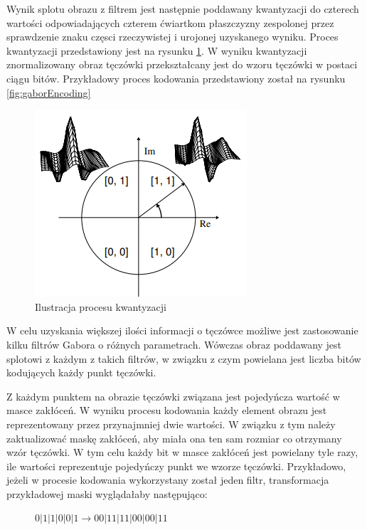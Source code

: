 Wynik splotu obrazu z filtrem jest następnie poddawany kwantyzacji \cite{DaugmanHowIrisRecognitionWorks} do czterech wartości odpowiadających
czterem \'cwiartkom płaszczyzny zespolonej przez sprawdzenie znaku częsci rzeczywistej i urojonej
uzyskanego wyniku. Proces kwantyzacji przedstawiony jest na rysunku \ref{fig:encodingQuant}. W wyniku
kwantyzacji znormalizowany obraz tęczówki przekształcany jest do wzoru tęczówki w postaci ciągu bitów.
Przykładowy proces kodowania przedstawiony został na rysunku \ref{fig:gaborEncoding}

\begin{figure}[ht]
  \centering
  \includegraphics{images/encoding/quantization.png}
  \caption{Ilustracja procesu kwantyzacji}
  \label{fig:encodingQuant}
\end{figure}

W celu uzyskania większej ilości informacji o tęczówce możliwe jest zastosowanie kilku filtrów
Gabora o różnych parametrach. Wówczas obraz poddawany jest splotowi z każdym z takich filtrów, w
związku z czym powielana jest liczba bitów kodujących każdy punkt tęczówki.

Z każdym punktem na obrazie tęczówki związana jest pojedyńcza wartoś\'c w masce zakłóceń. W wyniku
procesu kodowania każdy element obrazu jest reprezentowany przez przynajmniej dwie wartości. W związku
z tym należy zaktualizowa\'c maskę zakłóceń, aby miała ona ten sam rozmiar co otrzymany wzór tęczówki.
W tym celu każdy bit w masce zakłóceń jest powielany tyle razy, ile wartości reprezentuje pojedyńczy
punkt we wzorze tęczówki. Przykładowo, jeżeli w procesie kodowania wykorzystany został jeden filtr,
transformacja przykładowej maski wyglądałaby następująco:

\begin{figure}[ht]
  \centering
  $0|1|1|0|0|1 \rightarrow 00|11|11|00|00|11$
\end{figure}

